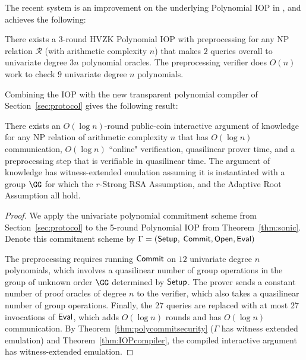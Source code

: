 The recent system  is an improvement on the underlying Polynomial IOP in , and achieves the following: 

\begin{theorem} 
There exists a 3-round HVZK Polynomial IOP with preprocessing for any NP relation $\mathcal{R}$ (with arithmetic complexity $n$) that makes $2$ queries overall to univariate degree $3n$ polynomial oracles. The preprocessing verifier does $O(n)$ work to check $9$ univariate degree $n$ polynomials.
\end{theorem}

Combining the  IOP with the new transparent polynomial compiler of Section~\ref{sec:protocol} gives the following result:  

\begin{theorem}
There exists an $O(\log n)$-round public-coin interactive argument of knowledge for any NP relation of arithmetic complexity $n$ that has $O(\log n)$ communication, $O(\log n)$ ``online" verification, quasilinear prover time, and a preprocessing step that is verifiable in quasilinear time. The argument of knowledge has witness-extended emulation assuming it is instantiated with a group $\GG$ for which the $r$-Strong RSA Assumption, and the Adaptive Root Assumption all hold. 
\end{theorem}
\begin{proof}
We apply the univariate polynomial commitment scheme from Section~\ref{sec:protocol} to the 5-round Polynomial IOP from Theorem~\ref{thm:sonic}. Denote this commitment scheme by $\Gamma = (\textsf{{Setup}},$ $\textsf{{Commit}}, \textsf{{Open}}, \textsf{{Eval}})$ 

The preprocessing requires running $\textsf{{Commit}}$ on $12$ univariate degree $n$ polynomials, which involves a quasilinear number of group operations in the group of unknown order $\GG$ determined by $\textsf{{Setup}}$. The prover sends a constant number of proof oracles of degree $n$ to the verifier, which also takes a quasilinear number of group operations. Finally, the 27 queries are replaced with at most $27$ invocations of $\textsf{{Eval}}$, which adds $O(\log n )$ rounds and has $O(\log n)$ communication. By Theorem~\ref{thm:polycommitsecurity} ($\Gamma$ has witness extended emulation) and Theorem~\ref{thm:IOPcompiler}, the compiled interactive argument has witness-extended emulation.
\end{proof}

\ifappendix
\else

\fi


